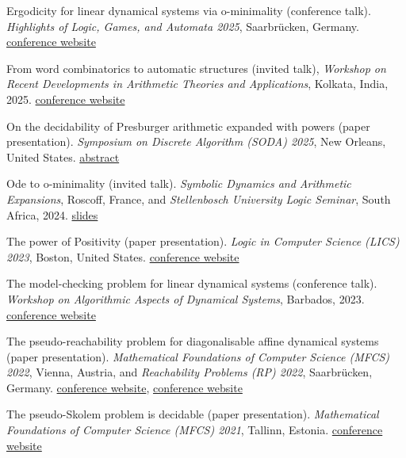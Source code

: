 \documentclass{article}
\begin{document}
\begin{etaremune}
		\item Ergodicity for linear dynamical systems via o-minimality (conference talk). 
		\emph{Highlights of Logic, Games, and Automata 2025}, Saarbr\"ucken, Germany. \href{https://highlights-conference.org/2025/}{conference website}
		
		\item From word combinatorics to automatic structures (invited talk), \emph{Workshop on Recent Developments in Arithmetic Theories and Applications}, Kolkata, India, 2025. \href{https://logicindia.org/icla/icla2025/}{conference website}
		
		\item On the decidability of Presburger arithmetic expanded with powers (paper presentation). \emph{Symposium on Discrete Algorithm (SODA) 2025}, New Orleans, United States. \href{https://meetings.siam.org/sess/dsp_talk.cfm?p=145077}{abstract}
		
		\item Ode to o-minimality (invited talk). \emph{Symbolic Dynamics and Arithmetic Expansions}, Roscoff, France, and \emph{Stellenbosch University Logic Seminar}, South Africa, 2024. \href{https://www.irif.fr/~symdynar/uploads/Main/karimov_roscoff.pdf}{slides}
		
		\item The power of Positivity (paper presentation). \emph{Logic in Computer Science (LICS) 2023}, Boston, United States. \href{https://lics.siglog.org/archive/2023/}{conference website}
		
		\item The model-checking problem for linear dynamical systems (conference talk). \emph{Workshop on Algorithmic Aspects of Dynamical Systems}, Barbados, 2023. \href{https://bellairs2023.mpi-sws.org/}{conference website}
		
		\item The pseudo-reachability problem for diagonalisable affine dynamical systems (paper presentation). \emph{Mathematical Foundations of Computer Science (MFCS) 2022}, Vienna, Austria, and \emph{Reachability Problems (RP) 2022}, Saarbr\"ucken, Germany. \href{https://www.ac.tuwien.ac.at/mfcs2022/accepted/}{conference website}, 
		\href{https://rp2022.mpi-sws.org/program.html}{conference website}
		
		\item The pseudo-Skolem problem is decidable (paper presentation). \emph{Mathematical Foundations of Computer Science (MFCS) 2021}, Tallinn, Estonia. \href{https://compose.ioc.ee/mfcs/accepted.php}{conference website}
		

\end{etaremune}
\end{document}
